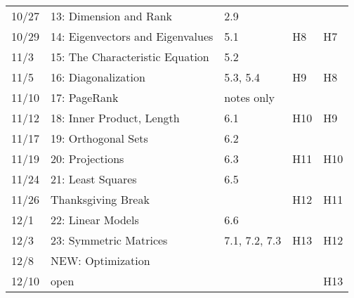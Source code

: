\documentclass[11pt]{article}
\begin{document}
\begin{centering}
\begin{tabular}{||l|p{3in}|l|l|l||}
10/27 & 13: Dimension and Rank & 2.9 &  &\\ 
10/29 & 14: Eigenvectors and Eigenvalues & 5.1 & H8 & H7\\ 
\hline

11/3 & 15: The Characteristic Equation & 5.2 &  &\\ 
11/5 & 16: Diagonalization & 5.3, 5.4 & H9 & H8\\ 
\hline

11/10 & 17: PageRank & notes only &  &\\  %
11/12 & 18: Inner Product, Length & 6.1 & H10 & H9\\
\hline

11/17 & 19: Orthogonal Sets & 6.2 & &\\ 
11/19 & 20: Projections & 6.3 & H11 & H10\\ 
 \hline

11/24 &21: Least Squares & 6.5 &  & \\ 
11/26 & Thanksgiving Break &&H12 &H11\\
\hline 

12/1 & 22: Linear Models & 6.6 & & \\ 
12/3 & 23: Symmetric Matrices & 7.1, 7.2, 7.3 &  H13 &H12\\ 
\hline  
 12/8 & NEW: Optimization &&&\\
12/10 & open &  &  &H13\\ 
\hline\hline


\end{tabular}\\
\end{centering}
\end{document}
